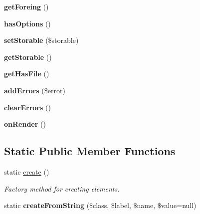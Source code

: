 \begin{DoxyCompactItemize}
\item 
\hypertarget{class_element_a2164b0f3275f29aff64a0942e685826a}{
{\bfseries getForeing} ()}
\label{class_element_a2164b0f3275f29aff64a0942e685826a}

\item 
\hypertarget{class_element_ab5d28c301381331fbc0a56a6a19d9773}{
{\bfseries hasOptions} ()}
\label{class_element_ab5d28c301381331fbc0a56a6a19d9773}

\item 
\hypertarget{class_element_a65f039965f167a42acf2bba6e28f50c7}{
{\bfseries setStorable} (\$storable)}
\label{class_element_a65f039965f167a42acf2bba6e28f50c7}

\item 
\hypertarget{class_element_a3c28e46fcaf589b0da0367d72d9ef6a5}{
{\bfseries getStorable} ()}
\label{class_element_a3c28e46fcaf589b0da0367d72d9ef6a5}

\item 
\hypertarget{class_element_ae2c9683e1a1c20ab65cc2b2f2a847187}{
{\bfseries getHasFile} ()}
\label{class_element_ae2c9683e1a1c20ab65cc2b2f2a847187}

\item 
\hypertarget{class_element_ace8a64e949ec51401b7a4849c962545a}{
{\bfseries addErrors} (\$error)}
\label{class_element_ace8a64e949ec51401b7a4849c962545a}

\item 
\hypertarget{class_element_aeec3eb51548cd8e3994f67300f536bd5}{
{\bfseries clearErrors} ()}
\label{class_element_aeec3eb51548cd8e3994f67300f536bd5}

\item 
\hypertarget{class_element_a7655c4eb63d77dedce00b262ba0c56cc}{
{\bfseries onRender} ()}
\label{class_element_a7655c4eb63d77dedce00b262ba0c56cc}

\end{DoxyCompactItemize}
\subsection*{Static Public Member Functions}
\begin{DoxyCompactItemize}
\item 
static \hyperlink{class_element_af57abc2c07e1d0e03b305345ef237038}{create} ()
\begin{DoxyCompactList}\small\item\em Factory method for creating elements. \item\end{DoxyCompactList}\item 
\hypertarget{class_element_a4c2a461b67783e62a3f085dfeea405c5}{
static {\bfseries createFromString} (\$class, \$label, \$name, \$value=null)}
\label{class_element_a4c2a461b67783e62a3f085dfeea405c5}

\end{DoxyCompactItemize}

